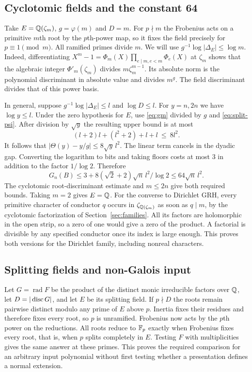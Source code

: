\subsection*{Cyclotomic fields and the constant 64}
Take $E=\mathbb Q(\zeta_m)$, $g=\varphi(m)$ and $D=m$. For $p\nmid m$ the Frobenius acts on a primitive $m$th root by the $p$th-power map, so it fixes the field precisely for $p\equiv1\pmod m$. All ramified primes divide $m$. We will use $g^{-1}\log|\Delta_E|\le\log m$. Indeed, differentiating $X^m-1=\Phi_m(X)\prod_{e\mid m,e<m}\Phi_e(X)$ at $\zeta_m$ shows that the algebraic integer $\Phi'_m(\zeta_m)$ divides $m\zeta_m^{m-1}$. Its absolute norm is the polynomial discriminant in absolute value and divides $m^g$. The field discriminant divides that of this power basis.

In general, suppose $g^{-1}\log|\Delta_E|\le l$ and $\log D\le l$. For $y=n,2n$ we have $\log y\le l$. Under the zero hypothesis for $E$, use \eqref{eq:gm} divided by $g$ and \eqref{eq:split-psi}. After division by $\sqrt y$ the resulting upper bound is at most
\[
  (l+2)l+(l^2+2)+l+l\ \le\ 8l^2.
\]
It follows that $|\Theta(y)-y/g|\le8\sqrt y\,l^2$. The linear term cancels in the dyadic gap. Converting the logarithm to bits and taking floors costs at most $3$ in addition to the factor $1/\log 2$. Therefore
\[
 G_n(B)\le3+8(\sqrt2+2)\sqrt n\,l^2/\log 2
           \le64\sqrt n\,l^2.
\]
The cyclotomic root-discriminant estimate and $m\le2n$ give both required bounds. Taking $m=2$ gives $E=\mathbb Q$. For the converse to Dirichlet GRH, every primitive character of conductor $q$ occurs in $\zeta_{\mathbb Q(\zeta_m)}$ as soon as $q\mid m$, by the cyclotomic factorization of Section~\ref{sec:families}. All its factors are holomorphic in the open strip, so a zero of one would give a zero of the product. A factorial is divisible by any specified conductor once its index is large enough. This proves both versions for the Dirichlet family, including nonreal characters.

\subsection*{Splitting fields and non-Galois input}
Let $G=\operatorname{rad}F$ be the product of the distinct monic irreducible factors over $\mathbb Q$, let $D=|\operatorname{disc} G|$, and let $E$ be its splitting field. If $p\nmid D$ the roots remain pairwise distinct modulo any prime of $E$ above $p$. Inertia fixes their residues and therefore fixes every root, so $p$ is unramified. Frobenius now acts by the $p$th power on the reductions. All roots reduce to $\mathbb F_p$ exactly when Frobenius fixes every root, that is, when $p$ splits completely in $E$. Testing $F$ with multiplicities gives the same answer at these primes. This proves the required comparison for an arbitrary input polynomial without first testing whether a presentation defines a normal extension.

